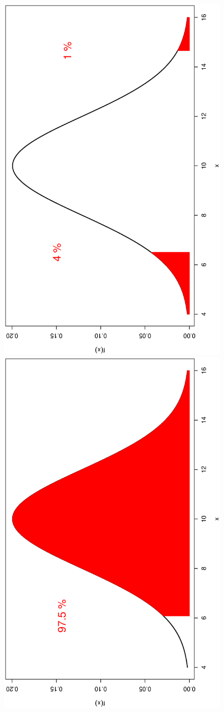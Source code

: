 \documentclass[captions=tableheading, 12pt, headings=small, parskip=half]{scrartcl}
\begin{document}
\begin{figure}[H]
\begin{minipage}{0.49\columnwidth}
	\end{minipage}
	\hfill
	\begin{minipage}{0.49\columnwidth}
		\includegraphics[height = \columnwidth, angle = -90]{Code1/CV3.eps}
		\includegraphics[height = \columnwidth, angle = -90]{Code1/CV4.eps}
	\end{minipage}
\end{figure}
\end{document}
